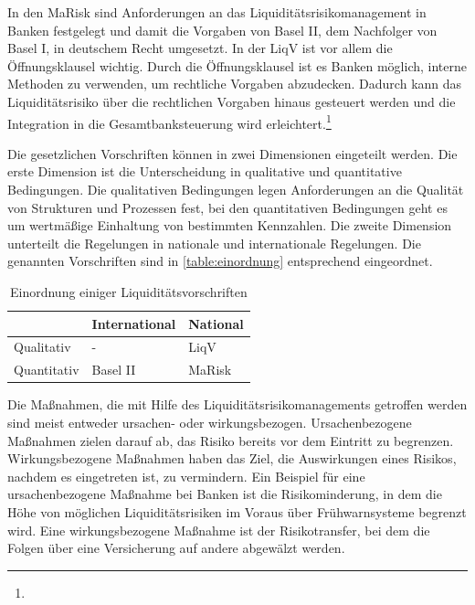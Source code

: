 \begin{onehalfspacing}
In den \gls{MaRisk} sind Anforderungen an das Liquiditätsrisikomanagement in Banken festgelegt und damit die Vorgaben von Basel II, dem Nachfolger von Basel I, in deutschem Recht umgesetzt. In der \gls{LiqV} ist vor allem die Öffnungsklausel wichtig. Durch die Öffnungsklausel ist es Banken möglich, interne Methoden zu verwenden, um rechtliche Vorgaben abzudecken. Dadurch kann das Liquiditätsrisiko über die rechtlichen Vorgaben hinaus gesteuert werden und die Integration in die Gesamtbanksteuerung wird erleichtert.\footnote{ }

Die gesetzlichen Vorschriften können in zwei Dimensionen eingeteilt werden. Die erste Dimension ist die Unterscheidung in qualitative und quantitative Bedingungen. Die qualitativen Bedingungen legen Anforderungen an die Qualität von Strukturen und Prozessen fest, bei den quantitativen Bedingungen geht es um wertmäßige Einhaltung von bestimmten Kennzahlen. Die zweite Dimension unterteilt die Regelungen in nationale und internationale Regelungen. Die genannten Vorschriften sind in \vref{table:einordnung} entsprechend eingeordnet.

{
\setlength{\extrarowheight}{2pt}
\begin{table}[htbp]
\centering
\begin{tabular}{| l | >{\centering\arraybackslash} m{4cm} | >{\centering\arraybackslash} m{4cm} |}
\cline{2-3}
\multicolumn{1}{l|}{}	& International & National 		\\	\hline
Qualitativ 				& - 			& \gls{LiqV}	\\	\hline
Quantitativ 			& Basel II 		& \gls{MaRisk}	\\	\hline
\end{tabular} 
\caption{Einordnung einiger Liquiditätsvorschriften \label{table:einordnung}}
\end{table}
}

Die Maßnahmen, die mit Hilfe des Liquiditätsrisikomanagements getroffen werden sind meist entweder ursachen- oder wirkungsbezogen. Ursachenbezogene Maßnahmen zielen darauf ab, das Risiko bereits vor dem Eintritt zu begrenzen. Wirkungsbezogene Maßnahmen haben das Ziel, die Auswirkungen eines Risikos, nachdem es eingetreten ist, zu vermindern. Ein Beispiel für eine ursachenbezogene Maßnahme bei Banken ist die Risikominderung, in dem die Höhe von möglichen Liquiditätsrisiken im Voraus über Frühwarnsysteme begrenzt wird. Eine wirkungsbezogene Maßnahme ist der Risikotransfer, bei dem die Folgen über eine Versicherung auf andere abgewälzt werden.


\end{onehalfspacing}
